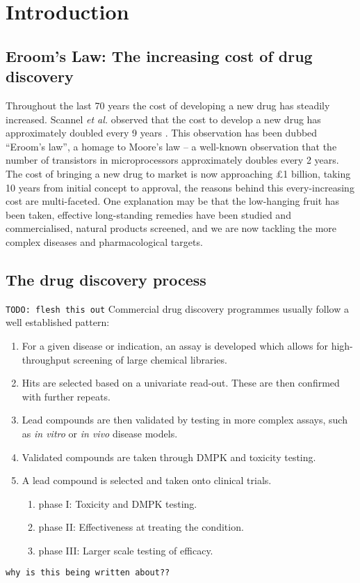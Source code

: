 \documentclass[a4paper,11pt,twoside,openright]{scrbook}
\begin{document}
\chapter{Introduction} \label{chapter:intro}

\section{Eroom's Law: The increasing cost of drug discovery}
Throughout the last 70 years the cost of developing a new drug has steadily increased.
Scannel \textit{et al.} observed that the cost to develop a new drug has approximately doubled every 9 years \cite{Scannell2012}.
This observation has been dubbed ``Eroom's law'', a homage to Moore's law -- a well-known observation that the number of transistors in microprocessors approximately doubles every 2 years.
The cost of bringing a new drug to market is now approaching £1 billion, taking 10 years from initial concept to approval, the reasons behind this every-increasing cost are multi-faceted.
One explanation may be that the low-hanging fruit has been taken, effective long-standing remedies have been studied and commercialised, natural products screened, and we are now tackling the more complex diseases and pharmacological targets.

\section{The drug discovery process}
\texttt{TODO: flesh this out}
Commercial drug discovery programmes usually follow a well established pattern:
\begin{enumerate}
    \item For a given disease or indication, an assay is developed which allows for high-throughput screening of large chemical libraries.
    \item Hits are selected based on a univariate read-out. These are then confirmed with further repeats.
    \item Lead compounds are then validated by testing in more complex assays, such as \textit{in vitro} or \textit{in vivo} disease models.
    \item Validated compounds are taken through DMPK and toxicity testing.
    \item A lead compound is selected and taken onto clinical trials.
        \begin{enumerate}
            \item phase I: Toxicity and DMPK testing.
            \item phase II: Effectiveness at treating the condition.
            \item phase III: Larger scale testing of efficacy.
        \end{enumerate}
\end{enumerate}
\texttt{why is this being written about??}
\end{document}
